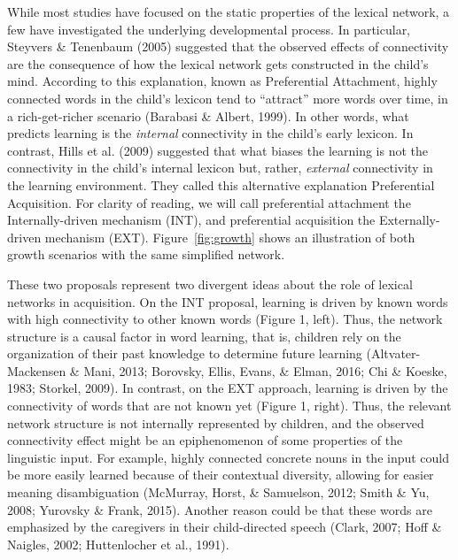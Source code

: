 \documentclass[english,,man,floatsintext]{apa6}
\begin{document}
While most studies have focused on the static properties of the lexical network, a few have investigated the underlying developmental process. In particular, Steyvers \& Tenenbaum (2005) suggested that the observed effects of connectivity are the consequence of how the lexical network gets constructed in the child's mind. According to this explanation, known as Preferential Attachment, highly connected words in the child's lexicon tend to \enquote{attract} more words over time, in a rich-get-richer scenario (Barabasi \& Albert, 1999). In other words, what predicts learning is the \emph{internal} connectivity in the child's early lexicon. In contrast, Hills et al. (2009) suggested that what biases the learning is not the connectivity in the child's internal lexicon but, rather, \emph{external} connectivity in the learning environment. They called this alternative explanation Preferential Acquisition. For clarity of reading, we will call preferential attachment the Internally-driven mechanism (INT), and preferential acquisition the Externally-driven mechanism (EXT). Figure~\ref{fig:growth} shows an illustration of both growth scenarios with the same simplified network.

These two proposals represent two divergent ideas about the role of lexical networks in acquisition. On the INT proposal, learning is driven by known words with high connectivity to other known words (Figure 1, left). Thus, the network structure is a causal factor in word learning, that is, children rely on the organization of their past knowledge to determine future learning (Altvater-Mackensen \& Mani, 2013; Borovsky, Ellis, Evans, \& Elman, 2016; Chi \& Koeske, 1983; Storkel, 2009). In contrast, on the EXT approach, learning is driven by the connectivity of words that are not known yet (Figure 1, right). Thus, the relevant network structure is not internally represented by children, and the observed connectivity effect might be an epiphenomenon of some properties of the linguistic input. For example, highly connected concrete nouns in the input could be more easily learned because of their contextual diversity, allowing for easier meaning disambiguation (McMurray, Horst, \& Samuelson, 2012; Smith \& Yu, 2008; Yurovsky \& Frank, 2015). Another reason could be that these words are emphasized by the caregivers in their child-directed speech (Clark, 2007; Hoff \& Naigles, 2002; Huttenlocher et al., 1991).
\end{document}

